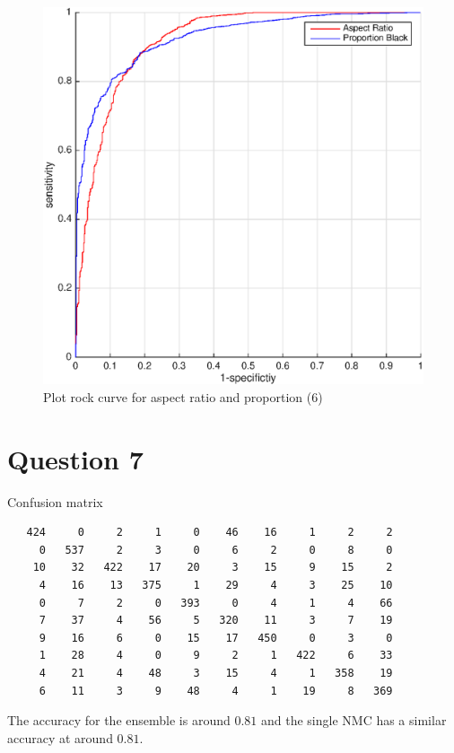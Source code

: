 \documentclass{article}
\begin{document}
\begin{figure}
\centering
\includegraphics[width=\textwidth]{plot6}
\caption{Plot rock curve for aspect ratio and proportion (6)}
\label{fig:plot6}
\end{figure}


\pagebreak
\section*{Question 7}

\pagebreak
Confusion matrix

\begin{lstlisting}
   424     0     2     1     0    46    16     1     2     2
     0   537     2     3     0     6     2     0     8     0
    10    32   422    17    20     3    15     9    15     2
     4    16    13   375     1    29     4     3    25    10
     0     7     2     0   393     0     4     1     4    66
     7    37     4    56     5   320    11     3     7    19
     9    16     6     0    15    17   450     0     3     0
     1    28     4     0     9     2     1   422     6    33
     4    21     4    48     3    15     4     1   358    19
     6    11     3     9    48     4     1    19     8   369
\end{lstlisting}

The accuracy for the ensemble is around $ 0.81 $ and the single NMC has a similar accuracy at around $ 0.81 $. 
\end{document}
